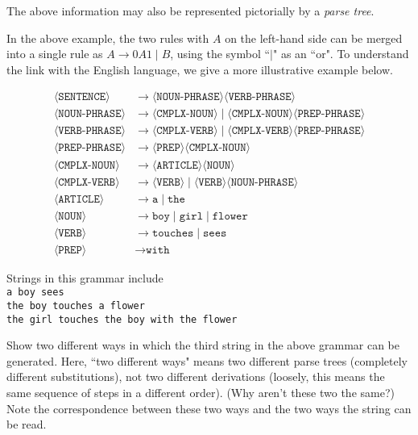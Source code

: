 \bigskip
The above information may also be represented pictorially by a \textit{parse tree}.

\vspace{3mm}
In the above example, the two rules with $A$ on the left-hand side can be merged into a single rule as  $A\to 0A1\mid B$, using the symbol ``$|$" as an ``or". To understand the link with the English language, we give a more illustrative example below.
\begin{example}
\begin{align*}
    \langle\texttt{SENTENCE}\rangle &\to \langle\texttt{NOUN-PHRASE}\rangle\langle\texttt{VERB-PHRASE}\rangle \\
    \langle\texttt{NOUN-PHRASE}\rangle &\to \langle\texttt{CMPLX-NOUN}\rangle\mid\langle\texttt{CMPLX-NOUN}\rangle\langle\texttt{PREP-PHRASE}\rangle \\
    \langle\texttt{VERB-PHRASE}\rangle&\to\langle\texttt{CMPLX-VERB}\rangle\mid\langle\texttt{CMPLX-VERB}\rangle\langle\texttt{PREP-PHRASE}\rangle \\
    \langle\texttt{PREP-PHRASE}\rangle&\to\langle\texttt{PREP}\rangle\langle\texttt{CMPLX-NOUN}\rangle \\
    \langle\texttt{CMPLX-NOUN}\rangle&\to\langle\texttt{ARTICLE}\rangle\langle\texttt{NOUN}\rangle \\
    \langle\texttt{CMPLX-VERB}\rangle&\to\langle\texttt{VERB}\rangle\mid\langle\texttt{VERB}\rangle\langle\texttt{NOUN-PHRASE}\rangle \\
    \langle\texttt{ARTICLE}\rangle&\to\texttt{a}\mid\texttt{the} \\
    \langle\texttt{NOUN}\rangle&\to\texttt{boy}\mid\texttt{girl}\mid\texttt{flower} \\
    \langle\texttt{VERB}\rangle&\to\texttt{touches}\mid\texttt{sees}\\
    \langle\texttt{PREP}\rangle&\to\texttt{with}
\end{align*}

Strings in this grammar include\\
\quad \texttt{a boy sees} \\    
\quad \texttt{the boy touches a flower} \\
\quad \texttt{the girl touches the boy with the flower}
\end{example}

\begin{exercise}
Show two different ways in which the third string in the above grammar can be generated. Here, ``two different ways" means two different parse trees (completely different substitutions), not two different derivations (loosely, this means the same sequence of steps in a different order). (Why aren't these two the same?) Note the correspondence between these two ways and the two ways the string can be read.
\end{exercise}

